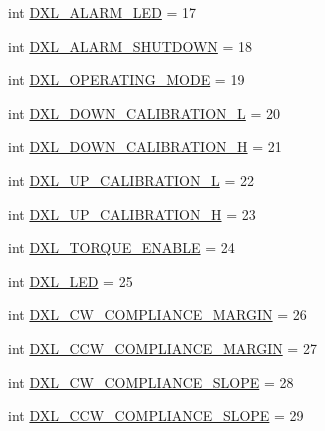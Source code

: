 \begin{DoxyCompactItemize}
\item 
int \hyperlink{namespacedynamixel__driver_1_1dynamixel__const_a0a8aba9072cde58c3f9340ecbaded36e}{D\+X\+L\+\_\+\+A\+L\+A\+R\+M\+\_\+\+L\+ED} = 17
\item 
int \hyperlink{namespacedynamixel__driver_1_1dynamixel__const_adb766ad29f2c1bf22c39b9da3d81cb08}{D\+X\+L\+\_\+\+A\+L\+A\+R\+M\+\_\+\+S\+H\+U\+T\+D\+O\+WN} = 18
\item 
int \hyperlink{namespacedynamixel__driver_1_1dynamixel__const_a54c71233223f7ee22217a32ba7f294c0}{D\+X\+L\+\_\+\+O\+P\+E\+R\+A\+T\+I\+N\+G\+\_\+\+M\+O\+DE} = 19
\item 
int \hyperlink{namespacedynamixel__driver_1_1dynamixel__const_a95551d2332af1f76cb527ef70eac55a9}{D\+X\+L\+\_\+\+D\+O\+W\+N\+\_\+\+C\+A\+L\+I\+B\+R\+A\+T\+I\+O\+N\+\_\+L} = 20
\item 
int \hyperlink{namespacedynamixel__driver_1_1dynamixel__const_a5f7481c435e4fdf37729a117cf4bc20c}{D\+X\+L\+\_\+\+D\+O\+W\+N\+\_\+\+C\+A\+L\+I\+B\+R\+A\+T\+I\+O\+N\+\_\+H} = 21
\item 
int \hyperlink{namespacedynamixel__driver_1_1dynamixel__const_a30b2155bce657aa9c037e076b5dd5660}{D\+X\+L\+\_\+\+U\+P\+\_\+\+C\+A\+L\+I\+B\+R\+A\+T\+I\+O\+N\+\_\+L} = 22
\item 
int \hyperlink{namespacedynamixel__driver_1_1dynamixel__const_aefaa3fd79aead6cf6ebb81cfe1c38a32}{D\+X\+L\+\_\+\+U\+P\+\_\+\+C\+A\+L\+I\+B\+R\+A\+T\+I\+O\+N\+\_\+H} = 23
\item 
int \hyperlink{namespacedynamixel__driver_1_1dynamixel__const_a0402a1719df08ad6e2eba140b3635837}{D\+X\+L\+\_\+\+T\+O\+R\+Q\+U\+E\+\_\+\+E\+N\+A\+B\+LE} = 24
\item 
int \hyperlink{namespacedynamixel__driver_1_1dynamixel__const_a77cd083cac630be2d9315ba3ba8e200a}{D\+X\+L\+\_\+\+L\+ED} = 25
\item 
int \hyperlink{namespacedynamixel__driver_1_1dynamixel__const_a84938b1bb16d9ac1c62a75184e133432}{D\+X\+L\+\_\+\+C\+W\+\_\+\+C\+O\+M\+P\+L\+I\+A\+N\+C\+E\+\_\+\+M\+A\+R\+G\+IN} = 26
\item 
int \hyperlink{namespacedynamixel__driver_1_1dynamixel__const_a23c480df9de683ef6938523f40a86402}{D\+X\+L\+\_\+\+C\+C\+W\+\_\+\+C\+O\+M\+P\+L\+I\+A\+N\+C\+E\+\_\+\+M\+A\+R\+G\+IN} = 27
\item 
int \hyperlink{namespacedynamixel__driver_1_1dynamixel__const_a8efdae32983502e92af2a65c7f58faec}{D\+X\+L\+\_\+\+C\+W\+\_\+\+C\+O\+M\+P\+L\+I\+A\+N\+C\+E\+\_\+\+S\+L\+O\+PE} = 28
\item 
int \hyperlink{namespacedynamixel__driver_1_1dynamixel__const_afb875ec23c92b4f7e42dc5048be04f8c}{D\+X\+L\+\_\+\+C\+C\+W\+\_\+\+C\+O\+M\+P\+L\+I\+A\+N\+C\+E\+\_\+\+S\+L\+O\+PE} = 29

\end{DoxyCompactItemize}
